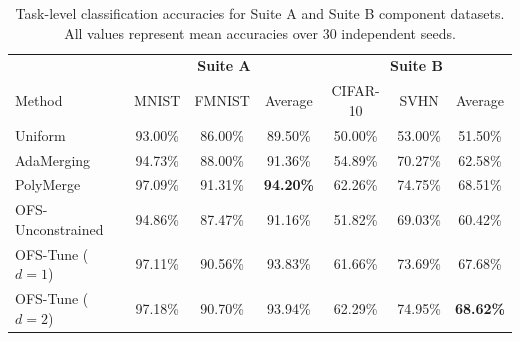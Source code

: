 \begin{table}[t]
\caption{Task-level classification accuracies for Suite A and Suite B component datasets.
All values represent mean accuracies over 30 independent seeds.}
\label{tab:suite_a_b}
\vskip 0.1in
\begin{center}
\begin{small}
\begin{sc}
\begin{tabular}{lccc|ccc}
\toprule
& \multicolumn{3}{c}{\textbf{Suite A}} & \multicolumn{3}{c}{\textbf{Suite B}} \\
Method & MNIST & FMNIST & Average & CIFAR-10 & SVHN & Average \\
\midrule
Uniform & 93.00\% & 86.00\% & 89.50\% & 50.00\% & 53.00\% & 51.50\% \\
AdaMerging & 94.73\% & 88.00\% & 91.36\% & 54.89\% & 70.27\% & 62.58\% \\
PolyMerge & 97.09\% & 91.31\% & \textbf{94.20\%} & 62.26\% & 74.75\% & 68.51\% \\
OFS-Unconstrained & 94.86\% & 87.47\% & 91.16\% & 51.82\% & 69.03\% & 60.42\% \\
OFS-Tune ($d=1$) & 97.11\% & 90.56\% & 93.83\% & 61.66\% & 73.69\% & 67.68\% \\
OFS-Tune ($d=2$) & 97.18\% & 90.70\% & 93.94\% & 62.29\% & 74.95\% & \textbf{68.62\%} \\
\bottomrule
\end{tabular}
\end{sc}
\end{small}
\end{center}
\vskip -0.1in
\end{table}

